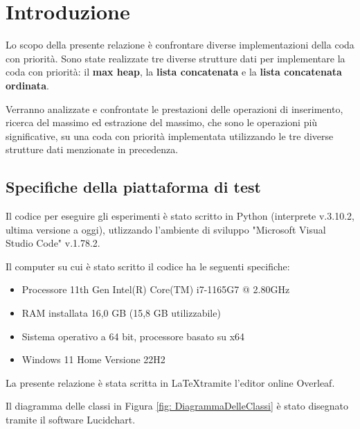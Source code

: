 \documentclass{article}
\begin{document}
\titleformat{\section}[hang]{\normalfont\Large\bfseries}{\thesection}{1em}{\raggedright}
\titleformat{\subsection}[hang]{\normalfont\large\bfseries}{\thesubsection}{1em}{\raggedright}

\section{Introduzione}
Lo scopo della presente relazione è confrontare diverse implementazioni della coda con priorità. Sono state realizzate tre diverse strutture dati per implementare la coda con priorità: il \textbf{max heap}, la \textbf{lista concatenata} e la \textbf{lista concatenata ordinata}.

Verranno analizzate e confrontate le prestazioni delle operazioni di inserimento, ricerca del massimo ed estrazione del massimo, che sono le operazioni più significative, su una coda con priorità implementata utilizzando le tre diverse strutture dati menzionate in precedenza.

\subsection{Specifiche della piattaforma di test}
Il codice per eseguire gli esperimenti è stato scritto in Python (interprete v.3.10.2, ultima versione a oggi), utlizzando l'ambiente di sviluppo "Microsoft Visual Studio Code" v.1.78.2. 

Il computer su cui è stato scritto il codice ha le seguenti specifiche:

\begin{itemize}
  \item Processore 11th Gen Intel(R) Core(TM) i7-1165G7 @ 2.80GHz
  \item RAM installata 16,0 GB (15,8 GB utilizzabile)
  \item Sistema operativo a 64 bit, processore basato su x64
  \item Windows 11 Home Versione	22H2
\end{itemize}

La presente relazione è stata scritta in \LaTeX tramite l'editor online Overleaf.

Il diagramma delle classi in Figura \ref{fig: DiagrammaDelleClassi} è stato disegnato tramite il software Lucidchart.
\end{document}
